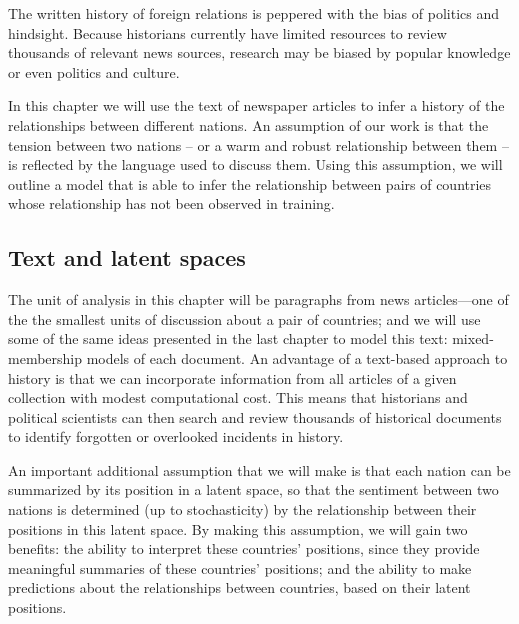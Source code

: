 
The written history of foreign relations is peppered with the bias of
politics and hindsight.  Because historians currently have limited
resources to review thousands of relevant news sources, research may
be biased by popular knowledge or even politics and culture. 

In this chapter we will use the text of newspaper articles to infer a
history of the relationships between different nations. An assumption
of our work is that the tension between two nations -- or a warm and
robust relationship between them -- is reflected by the language used
to discuss them. Using this assumption, we will outline a model that
is able to infer the relationship between pairs of countries whose
relationship has not been observed in training.


\subsection*{Text and latent spaces}
The unit of analysis in this chapter will be paragraphs from news
articles---one of the the smallest units of discussion about a pair of
countries; and we will use some of the same ideas presented in the last chapter to model this text: mixed-membership models of each document.  An advantage of a text-based approach to history is that
we can incorporate information from all articles of a given collection
with modest computational cost.  This means that historians and
political scientists can then search and review thousands of
historical documents to identify forgotten or overlooked incidents in
history.

An important additional assumption that we will make is that each
nation can be summarized by its position in a latent space, so that
the sentiment between two nations is determined (up to stochasticity)
by the relationship between their positions in this latent space.  By
making this assumption, we will gain two benefits: the ability to
interpret these countries' positions, since they provide meaningful
summaries of these countries' positions; and the ability to make
predictions about the relationships between countries, based on their
latent positions.

